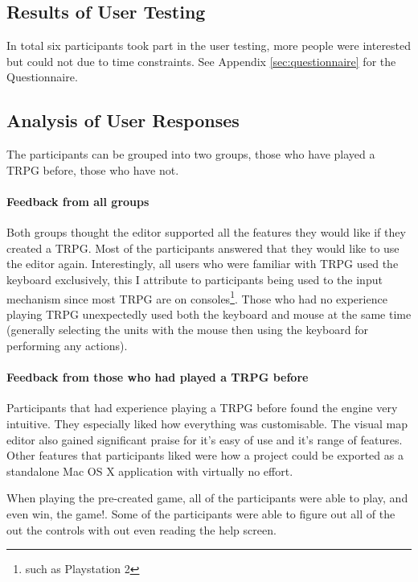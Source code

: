 \subsection{Results of User Testing}
\label{sub:results_of_user_testing}

In total six participants took part in the user testing, more people were interested but could not due to time constraints.  See Appendix \ref{sec:questionnaire} for the Questionnaire.

\subsection{Analysis of User Responses}
The participants can be grouped into two groups, those who have played a TRPG before, those who have not.
\paragraph{Feedback from  all groups\\}
Both groups thought the editor supported all the features they would like if they created a TRPG.  Most of the participants answered that they would like to use the editor again.  Interestingly, all users who were familiar with TRPG used the keyboard exclusively, this I attribute to participants being used to the input mechanism since most TRPG are on consoles\footnote{such as Playstation 2}. Those who had no experience playing TRPG unexpectedly used both the keyboard and mouse at the same time (generally selecting the units with the mouse then using the keyboard for performing any actions).

\paragraph{Feedback from those who had played a TRPG before\\}
Participants that had experience playing a TRPG before found the engine very intuitive. They especially liked how everything was customisable.  The visual map editor also gained significant praise for it's easy of use and it's range of features.  Other features that participants liked were how a project could be exported as a standalone Mac OS X application with virtually no effort. 

When playing the pre-created game, all of the participants were able to play, and even win, the game!. Some of the participants were able to figure out all of the out the controls with out even reading the help screen. 

